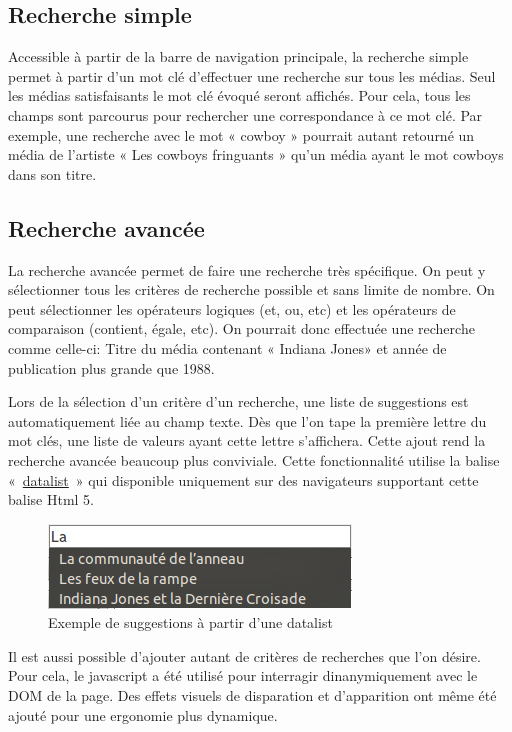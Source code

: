 \documentclass[letter, 11pt]{report}
\begin{document}
\subsection{Recherche simple}
Accessible à partir de la barre de navigation principale, la recherche simple permet à partir d'un mot clé d'effectuer une recherche sur tous les médias. Seul les médias satisfaisants le mot clé évoqué seront affichés. Pour cela, tous les champs sont parcourus pour rechercher une correspondance à ce mot clé. Par exemple, une recherche avec le mot « cowboy » pourrait autant retourné un média de l'artiste « Les cowboys fringuants » qu'un média ayant le mot cowboys dans son titre. 

\subsection{Recherche avancée}
\label{sec:recherche-avancée}
La recherche avancée permet de faire une recherche très spécifique. On peut y sélectionner tous les critères de recherche possible et sans limite de nombre. On peut sélectionner les opérateurs logiques (et, ou, etc) et les opérateurs de comparaison (contient, égale, etc). On pourrait donc effectuée une recherche comme celle-ci: Titre du média contenant « Indiana Jones» et année de publication plus grande que 1988.

Lors de la sélection d'un critère d'un recherche, une liste de suggestions est automatiquement liée au champ texte. Dès que l'on tape la première lettre du mot clés, une liste de valeurs ayant cette lettre s'affichera. Cette ajout rend la recherche avancée beaucoup plus conviviale. Cette fonctionnalité utilise la balise «~\href{http://www.w3schools.com/html5/tag_datalist.asp}{datalist}~» qui disponible uniquement sur des navigateurs supportant cette balise Html 5.

\begin{figure}[htbp]
	\begin{center}
		\includegraphics[scale=0.5]{exempleDatalist.png}
	\end{center}
	\caption{Exemple de suggestions à partir d'une datalist}
\end{figure}

Il est aussi possible d'ajouter autant de critères de recherches que l'on désire. Pour cela, le javascript a été utilisé pour interragir dinanymiquement avec le DOM de la page. Des effets visuels de disparation et d'apparition ont même été ajouté pour une ergonomie plus dynamique.
\end{document}
